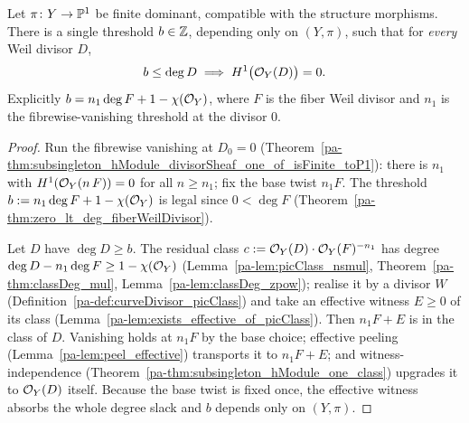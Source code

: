 \begin{theorem}
  \label{pa-thm:exists_bound_subsingleton_hModule_one}
  \leanok

  Let \(\pi \colon Y \to \mathbb{P}^1\) be finite dominant, compatible with the structure
  morphisms. There is a single threshold \(b \in \mathbb{Z}\), depending only on \((Y, \pi)\), such
  that for \emph{every} Weil divisor \(D\),
  \[
    b \le \deg D \implies H^1\bigl(\mathcal{O}_{Y}(D)\bigr) = 0 .
  \]
  Explicitly \(b = n_1 \deg F + 1 - \chi(\mathcal{O}_{Y})\), where \(F\) is the fiber Weil
  divisor and \(n_1\) is the fibrewise-vanishing threshold at the divisor \(0\).
\end{theorem}
\begin{proof}
  \leanok
  Run the fibrewise vanishing at \(D_0 = 0\)
  (Theorem~\ref{pa-thm:subsingleton_hModule_divisorSheaf_one_of_isFinite_toP1}): there is
  \(n_1\) with \(H^1(\mathcal{O}_{Y}(n\,F)) = 0\) for all \(n \ge n_1\); fix the base twist
  \(n_1 F\). The threshold \(b := n_1 \deg F + 1 - \chi(\mathcal{O}_{Y})\) is legal since
  \(0 < \deg F\) (Theorem~\ref{pa-thm:zero_lt_deg_fiberWeilDivisor}).

  Let \(D\) have \(\deg D \ge b\). The residual class
  \(c := \mathcal{O}_{Y}(D) \cdot \mathcal{O}_{Y}(F)^{-n_1}\) has degree
  \(\deg D - n_1\deg F \ge 1 - \chi(\mathcal{O}_{Y})\) (Lemma~\ref{pa-lem:picClass_nsmul},
  Theorem~\ref{pa-thm:classDeg_mul}, Lemma~\ref{pa-lem:classDeg_zpow}); realise it by a divisor
  \(W\) (Definition~\ref{pa-def:curveDivisor_picClass}) and take an effective witness
  \(E \ge 0\) of its class (Lemma~\ref{pa-lem:exists_effective_of_picClass}). Then
  \(n_1 F + E\) is in the class of \(D\). Vanishing holds at \(n_1 F\) by the base choice;
  effective peeling (Lemma~\ref{pa-lem:peel_effective}) transports it to \(n_1 F + E\); and
  witness-independence (Theorem~\ref{pa-thm:subsingleton_hModule_one_class}) upgrades it to
  \(\mathcal{O}_{Y}(D)\) itself. Because the base twist is fixed once, the effective witness
  absorbs the whole degree slack and \(b\) depends only on \((Y, \pi)\).
\end{proof}

